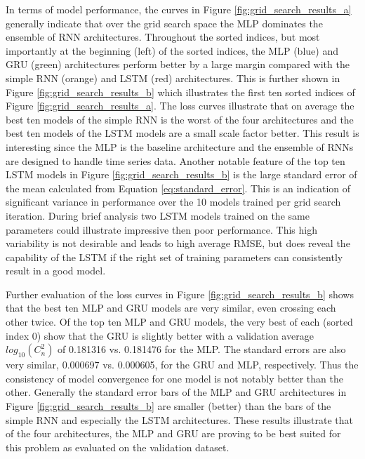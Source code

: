 In terms of model performance, the curves in Figure \ref{fig:grid_search_results_a} generally indicate that over the grid search space the MLP dominates the ensemble of RNN architectures. Throughout the sorted indices, but most importantly at the beginning (left) of the sorted indices, the MLP (blue) and GRU (green) architectures perform better by a large margin compared with the simple RNN (orange) and LSTM (red) architectures. This is further shown in Figure \ref{fig:grid_search_results_b} which illustrates the first ten sorted indices of Figure \ref{fig:grid_search_results_a}. The loss curves illustrate that on average the best ten models of the simple RNN is the worst of the four architectures and the best ten models of the LSTM models are a small scale factor better. This result is interesting since the MLP is the baseline architecture and the ensemble of RNNs are designed to handle time series data. Another notable feature of the top ten LSTM models in Figure \ref{fig:grid_search_results_b} is the large standard error of the mean calculated from Equation \ref{eq:standard_error}. This is an indication of significant variance in performance over the 10 models trained per grid search iteration. During brief analysis two LSTM models trained on the same parameters could illustrate impressive then poor performance. This high variability is not desirable and leads to high average RMSE, but does reveal the capability of the LSTM if the right set of training parameters can consistently result in a good model.

Further evaluation of the loss curves in Figure \ref{fig:grid_search_results_b} shows that the best ten MLP and GRU models are very similar, even crossing each other twice. Of the top ten MLP and GRU models, the very best of each (sorted index 0) show that the GRU is slightly better with a validation average $log_{10}(C_{n}^{2})$ of 0.181316 vs. 0.181476 for the MLP. The standard errors are also very similar, 0.000697 vs. 0.000605, for the GRU and MLP, respectively. Thus the consistency of model convergence for one model is not notably better than the other. Generally the standard error bars of the MLP and GRU architectures in Figure \ref{fig:grid_search_results_b} are smaller (better) than the bars of the simple RNN and especially the LSTM architectures. These results illustrate that of the four architectures, the MLP and GRU are proving to be best suited for this problem as evaluated on the validation dataset.

